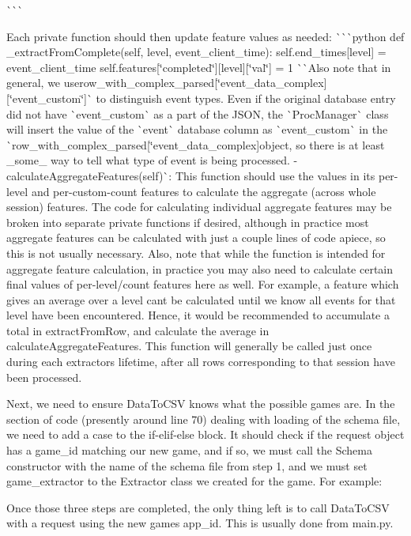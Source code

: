 \begin{DoxyEnumerate}
\`{}\`{}\`{}

Each private function should then update feature values as needed\+: \`{}\`{}\`{}python def \+\_\+extract\+From\+Complete(self, level, event\+\_\+client\+\_\+time)\+: self.\+end\+\_\+times\mbox{[}level\mbox{]} = event\+\_\+client\+\_\+time self.\+features\mbox{[}\char`\"{}completed\char`\"{}\mbox{]}\mbox{[}level\mbox{]}\mbox{[}\char`\"{}val\char`\"{}\mbox{]} = 1 \`{}\`{}{\ttfamily  Also note that in general, we use}row\+\_\+with\+\_\+complex\+\_\+parsed\mbox{[}\char`\"{}event\+\_\+data\+\_\+complex\mbox{]}\mbox{[}\char`\"{}event\+\_\+custom\char`\"{}\mbox{]}\`{} to distinguish event types. Even if the original database entry did not have \`{}event\+\_\+custom\`{} as a part of the J\+S\+O\+N, the \`{}\+Proc\+Manager\`{} class will insert the value of the \`{}event\`{} database column as \`{}event\+\_\+custom\`{} in the \`{}row\+\_\+with\+\_\+complex\+\_\+parsed\mbox{[}\char`\"{}event\+\_\+data\+\_\+complex\mbox{]}{\ttfamily object, so there is at least \+\_\+some\+\_\+ way to tell what type of event is being processed. -\/}calculate\+Aggregate\+Features(self)\`{}\+: This function should use the values in its per-\/level and per-\/custom-\/count features to calculate the aggregate (across whole session) features. The code for calculating individual aggregate features may be broken into separate private functions if desired, although in practice most aggregate features can be calculated with just a couple lines of code apiece, so this is not usually necessary. Also, note that while the function is intended for aggregate feature calculation, in practice you may also need to calculate certain final values of per-\/level/count features here as well. For example, a feature which gives an average over a level can\textquotesingle{}t be calculated until we know all events for that level have been encountered. Hence, it would be recommended to accumulate a total in extract\+From\+Row, and calculate the average in calculate\+Aggregate\+Features. This function will generally be called just once during each extractor\textquotesingle{}s lifetime, after all rows corresponding to that session have been processed.
\item Next, we need to ensure Data\+To\+C\+SV knows what the possible games are. In the section of code (presently around line 70) dealing with loading of the schema file, we need to add a case to the if-\/elif-\/else block. It should check if the request object has a game\+\_\+id matching our new game, and if so, we must call the Schema constructor with the name of the schema file from step 1, and we must set {\ttfamily game\+\_\+extractor} to the Extractor class we created for the game. For example\+: 
\begin{DoxyCode}{0}
\end{DoxyCode}

\item Once those three steps are completed, the only thing left is to call Data\+To\+C\+SV with a request using the new game\textquotesingle{}s app\+\_\+id. This is usually done from main.\+py. 
\end{DoxyEnumerate}